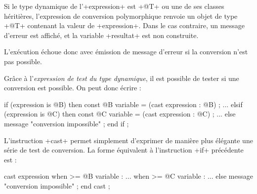Si le type dynamique de l'\ggs+expression+ est \ggs+@T+ ou une de ses classes héritières, l'expression de conversion polymorphique renvoie un objet de type \ggs+@T+ contenant la valeur de \ggs+expression+. Dans le cas contraire, un message d'erreur est affiché, et la variable \ggs+resultat+ est non construite.

L'exécution échoue donc avec émission de message d'erreur si la conversion n'est pas possible. 


Grâce à l'\emph{expression de test du type dynamique}, il est possible de tester si une conversion est possible. On peut donc écrire :

\begin{galgas}
if (expression is @B) then
  const @B variable = (cast expression : @B) ;
  ...
elsif (expression is @C) then
  const @C variable = (cast expression : @C) ;
  ...
else
  message "conversion impossible" ;
end if ;
\end{galgas}

L'instruction \ggs+cast+ permet simplement d'exprimer de manière plus élégante une série de test de conversion. La forme équivalent à l'instruction \ggs+if+ précédente est :

\begin{galgas}
cast expression
when >= @B variable :
  ...
when >= @C variable :
  ...
else
  message "conversion impossible" ;
end cast ;
\end{galgas}


